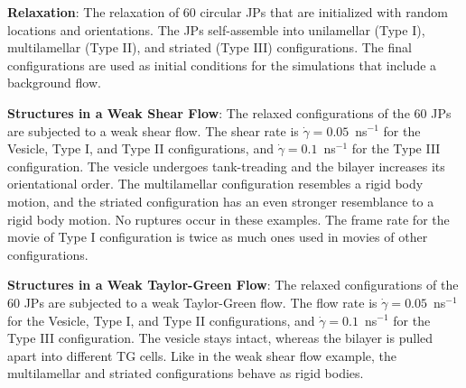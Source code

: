 \noindent
{\bf Relaxation}: The relaxation of 60 circular JPs that are initialized
with random locations and orientations. The JPs self-assemble into
unilamellar (Type I), multilamellar (Type II), and striated (Type III)
configurations. The final configurations are used as initial conditions
for the simulations that include a background flow. 



\noindent
{\bf Structures in a Weak Shear Flow}:
The relaxed configurations of the 60 JPs are subjected to a weak shear
flow. The shear rate is $\dot{\gamma} = 0.05$~ns$^{-1}$ for the Vesicle,
Type I, and Type II configurations, and $\dot{\gamma} = 0.1$~ns$^{-1}$
for the Type III configuration. The vesicle undergoes tank-treading and
the bilayer increases its orientational order. The multilamellar
configuration resembles a rigid body motion, and the striated
configuration has an even stronger resemblance to a rigid body motion.
No ruptures occur in these examples. The frame rate for the movie of 
Type I configuration is twice as much ones used in movies of other configurations.


\noindent
{\bf Structures in a Weak Taylor-Green Flow}:
The relaxed configurations of the 60 JPs are subjected to a weak
Taylor-Green flow. The flow rate is $\dot{\gamma} = 0.05$~ns$^{-1}$ for
the Vesicle, Type I, and Type II configurations, and $\dot{\gamma} =
0.1$~ns$^{-1}$ for the Type III configuration. The vesicle stays intact,
whereas the bilayer is pulled apart into different TG cells. Like in the
weak shear flow example, the multilamellar and striated configurations
behave as rigid bodies.

